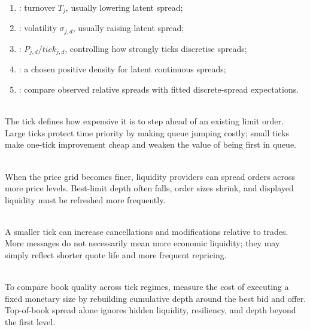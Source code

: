 \documentclass[a4paper,oneside,openany]{book}
\begin{document}
\begin{taxonomy} 
\begin{enumerate}[label=\roman*.]
\setlength{\itemsep}{0pt}
\item {}: turnover $T_j$, usually lowering latent spread;
\item {}: volatility $\sigma_{j,d}$, usually raising latent spread;
\item {}: $P_{j,d}/tick_{j,d}$, controlling how strongly ticks discretise spreads;
\item {}: a chosen positive density for latent continuous spreads;
\item {}: compare observed relative spreads with fitted discrete-spread expectations.
\end{enumerate}
\end{taxonomy}

\begin{principle} \\
The tick defines how expensive it is to step ahead of an existing limit order.\\
Large ticks protect time priority by making queue jumping costly; small ticks make one-tick improvement cheap and weaken the value of being first in queue.
\end{principle}

\begin{mechanism} \\
When the price grid becomes finer, liquidity providers can spread orders across more price levels. Best-limit depth often falls, order sizes shrink, and displayed liquidity must be refreshed more frequently.
\end{mechanism}

\begin{caveat} \\
A smaller tick can increase cancellations and modifications relative to trades. More messages do not necessarily mean more economic liquidity; they may simply reflect shorter quote life and more frequent repricing.
\end{caveat}

\begin{mechanism} \\
To compare book quality across tick regimes, measure the cost of executing a fixed monetary size by rebuilding cumulative depth around the best bid and offer. Top-of-book spread alone ignores hidden liquidity, resiliency, and depth beyond the first level.
\end{mechanism}
\end{document}
